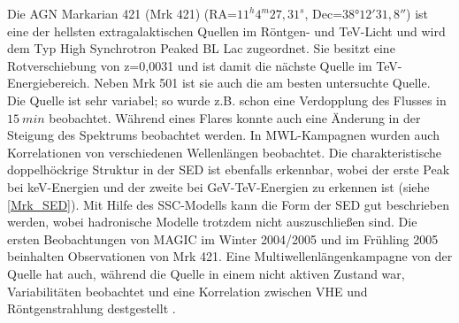 Die AGN Markarian 421 (Mrk 421) (RA=$11^h 4^m 27,31^s$, Dec=$38°12' 31,8''$) ist eine der hellsten extragalaktischen Quellen im Röntgen- und TeV-Licht und wird dem Typ High Synchrotron Peaked BL Lac zugeordnet.
Sie besitzt eine Rotverschiebung von z=0,0031 und ist damit die nächste Quelle im TeV-Energiebereich.
Neben Mrk 501 ist sie auch die am besten untersuchte Quelle.
Die Quelle ist sehr variabel; so wurde z.B. schon eine Verdopplung des Flusses in $\SI{15}{min}$ beobachtet.
Während eines Flares konnte auch eine Änderung in der Steigung des Spektrums beobachtet werden.
In MWL-Kampagnen wurden auch Korrelationen von verschiedenen Wellenlängen beobachtet.
Die charakteristische doppelhöckrige Struktur in der SED ist ebenfalls erkennbar, wobei der erste Peak bei keV-Energien und der zweite bei GeV-TeV-Energien zu erkennen ist (siehe \autoref{Mrk_SED}). 
Mit Hilfe des SSC-Modells kann die Form der SED gut beschrieben werden, wobei hadronische Modelle trotzdem nicht auszuschließen sind.
Die ersten Beobachtungen von MAGIC im Winter 2004/2005 und im Frühling 2005 beinhalten Observationen von Mrk 421.
Eine Multiwellenlängenkampagne von der Quelle hat auch, während die Quelle in einem nicht aktiven Zustand war, Variabilitäten beobachtet und eine Korrelation zwischen VHE und Röntgenstrahlung destgestellt \cite{MWL2009}.\cite{Weekes}